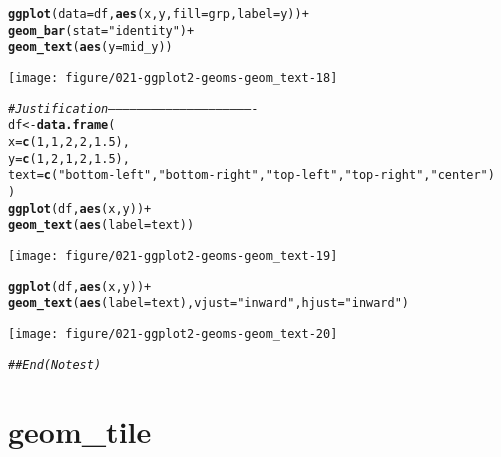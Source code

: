 \documentclass[a4paper,titlepage]{tufte-handout}\usepackage[]{graphicx}\usepackage[]{color}
\makeatletter
\def\maxwidth{ %
  \ifdim\Gin@nat@width>\linewidth
    \linewidth
  \else
    \Gin@nat@width
  \fi
}
\newcommand{\hlnum}[1]{\textcolor[rgb]{0.686,0.059,0.569}{#1}}%
\newcommand{\hlstr}[1]{\textcolor[rgb]{0.192,0.494,0.8}{#1}}%
\newcommand{\hlcom}[1]{\textcolor[rgb]{0.678,0.584,0.686}{\textit{#1}}}%
\newcommand{\hlopt}[1]{\textcolor[rgb]{0,0,0}{#1}}%
\newcommand{\hlstd}[1]{\textcolor[rgb]{0.345,0.345,0.345}{#1}}%
\newcommand{\hlkwb}[1]{\textcolor[rgb]{0.69,0.353,0.396}{#1}}%
\newcommand{\hlkwc}[1]{\textcolor[rgb]{0.333,0.667,0.333}{#1}}%
\newcommand{\hlkwd}[1]{\textcolor[rgb]{0.737,0.353,0.396}{\textbf{#1}}}%
\newenvironment{kframe}{%
 \def\at@end@of@kframe{}%
 \ifinner\ifhmode%
  \def\at@end@of@kframe{\end{minipage}}%
  \begin{minipage}{\columnwidth}%
 \fi\fi%
 \def\FrameCommand##1{\hskip\@totalleftmargin \hskip-\fboxsep
 \colorbox{shadecolor}{##1}\hskip-\fboxsep
     \hskip-\linewidth \hskip-\@totalleftmargin \hskip\columnwidth}%
 \MakeFramed {\advance\hsize-\width
   \@totalleftmargin\z@ \linewidth\hsize
   \@setminipage}}%
 {\par\unskip\endMakeFramed%
 \at@end@of@kframe}
\newenvironment{knitrout}{}{} %
\makeatother
\begin{document}
\begin{knitrout}
\begin{kframe}
\begin{alltt}
\hlkwd{ggplot}\hlstd{(}\hlkwc{data} \hlstd{= df,} \hlkwd{aes}\hlstd{(x, y,} \hlkwc{fill} \hlstd{= grp,} \hlkwc{label} \hlstd{= y))} \hlopt{+}
 \hlkwd{geom_bar}\hlstd{(}\hlkwc{stat} \hlstd{=} \hlstr{"identity"}\hlstd{)} \hlopt{+}
 \hlkwd{geom_text}\hlstd{(}\hlkwd{aes}\hlstd{(}\hlkwc{y} \hlstd{= mid_y))}
\end{alltt}
\end{kframe}
\texttt{[image: figure/021-ggplot2-geoms-geom\_text-18]} 
\begin{kframe}\begin{alltt}
\hlcom{# Justification -------------------------------------------------------------}
\hlstd{df} \hlkwb{<-} \hlkwd{data.frame}\hlstd{(}
  \hlkwc{x} \hlstd{=} \hlkwd{c}\hlstd{(}\hlnum{1}\hlstd{,} \hlnum{1}\hlstd{,} \hlnum{2}\hlstd{,} \hlnum{2}\hlstd{,} \hlnum{1.5}\hlstd{),}
  \hlkwc{y} \hlstd{=} \hlkwd{c}\hlstd{(}\hlnum{1}\hlstd{,} \hlnum{2}\hlstd{,} \hlnum{1}\hlstd{,} \hlnum{2}\hlstd{,} \hlnum{1.5}\hlstd{),}
  \hlkwc{text} \hlstd{=} \hlkwd{c}\hlstd{(}\hlstr{"bottom-left"}\hlstd{,} \hlstr{"bottom-right"}\hlstd{,} \hlstr{"top-left"}\hlstd{,} \hlstr{"top-right"}\hlstd{,} \hlstr{"center"}\hlstd{)}
\hlstd{)}
\hlkwd{ggplot}\hlstd{(df,} \hlkwd{aes}\hlstd{(x, y))} \hlopt{+}
  \hlkwd{geom_text}\hlstd{(}\hlkwd{aes}\hlstd{(}\hlkwc{label} \hlstd{= text))}
\end{alltt}
\end{kframe}
\texttt{[image: figure/021-ggplot2-geoms-geom\_text-19]} 
\begin{kframe}\begin{alltt}
\hlkwd{ggplot}\hlstd{(df,} \hlkwd{aes}\hlstd{(x, y))} \hlopt{+}
  \hlkwd{geom_text}\hlstd{(}\hlkwd{aes}\hlstd{(}\hlkwc{label} \hlstd{= text),} \hlkwc{vjust} \hlstd{=} \hlstr{"inward"}\hlstd{,} \hlkwc{hjust} \hlstd{=} \hlstr{"inward"}\hlstd{)}
\end{alltt}
\end{kframe}
\texttt{[image: figure/021-ggplot2-geoms-geom\_text-20]} 
\begin{kframe}\begin{alltt}
\hlcom{## End(No test)}
\end{alltt}
\end{kframe}
\end{knitrout}


\section{geom\_tile}
\end{document}
